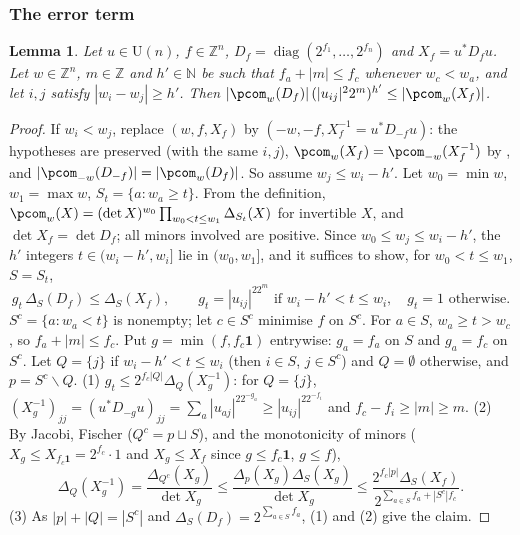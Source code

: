 \documentclass[10pt]{amsart}
\newtheorem{lemma}[theorem]{Lemma}
\theoremstyle{definition}
\theoremstyle{remark}
\newcommand{\N}{\mathbb N}
\newcommand{\Z}{\mathbb Z}
\providecommand{\auU}{\mathrm U}
\begin{document}
\subsubsection{The error term}\label{pbr:ss-error}

\begin{lemma}\label{pbr:gain}
Let $u\in\auU(n)$, $f\in\Z^n$, $D_f=\operatorname{diag}(2^{f_1},\dots,2^{f_n})$ and $X_f=u^*D_fu$. Let
$w\in\Z^n$, $m\in\Z$ and $h'\in\N$ be such that $f_a+|m|\le f_c$ whenever $w_c<w_a$, and let $i,j$ satisfy
$|w_i-w_j|\ge h'$. Then $|\pcom_w(D_f)|\,(|u_{ij}|^22^m)^{h'}\le|\pcom_w(X_f)|$.
\end{lemma}
\begin{proof}
If $w_i<w_j$, replace $(w,f,X_f)$ by $(-w,-f,X_f^{-1}=u^*D_{-f}u)$: the hypotheses are preserved (with
the same $i,j$), $\pcom_w(X_f)=\pcom_{-w}(X_f^{-1})$ by {\cite[Lemma~3.18(a)]{P49}}, and $|\pcom_{-w}
(D_{-f})|=|\pcom_w(D_f)|$. So assume $w_j\le w_i-h'$. Let $w_0=\min w$, $w_1=\max w$, $S_t=\{a:w_a\ge
t\}$. From the definition, $\pcom_w(X)=(\det X)^{w_0}\prod_{w_0<t\le w_1}\Delta_{S_t}(X)$ for invertible
$X$, and $\det X_f=\det D_f$; all minors involved are positive. Since $w_0\le w_j\le w_i-h'$, the $h'$
integers $t\in(w_i-h',w_i]$ lie in $(w_0,w_1]$, and it suffices to show, for $w_0<t\le w_1$, $S=S_t$,
\[
g_t\,\Delta_S(D_f)\le\Delta_S(X_f),\qquad g_t=|u_{ij}|^22^m\text{ if }w_i-h'<t\le w_i,\quad g_t=1
\text{ otherwise}.
\]
$S^c=\{a:w_a<t\}$ is nonempty; let $c\in S^c$ minimise $f$ on $S^c$. For $a\in S$, $w_a\ge t>w_c$, so
$f_a+|m|\le f_c$. Put $g=\min(f,f_c\mathbf 1)$ entrywise: $g_a=f_a$ on $S$ and $g_a=f_c$ on $S^c$. Let
$Q=\{j\}$ if $w_i-h'<t\le w_i$ (then $i\in S$, $j\in S^c$) and $Q=\emptyset$ otherwise, and $p=S^c
\smallsetminus Q$. (1) $g_t\le2^{f_c|Q|}\Delta_Q(X_g^{-1})$: for $Q=\{j\}$, $(X_g^{-1})_{jj}=(u^*D_{-g}
u)_{jj}=\sum_a|u_{aj}|^22^{-g_a}\ge|u_{ij}|^22^{-f_i}$ and $f_c-f_i\ge|m|\ge m$. (2) By Jacobi, Fischer
($Q^c=p\sqcup S$), and the monotonicity of minors ($X_g\le X_{f_c\mathbf 1}=2^{f_c}\cdot1$ and $X_g\le X_f$
since $g\le f_c\mathbf1$, $g\le f$),
\[
\Delta_Q(X_g^{-1})=\frac{\Delta_{Q^c}(X_g)}{\det X_g}\le\frac{\Delta_p(X_g)\Delta_S(X_g)}{\det X_g}
\le\frac{2^{f_c|p|}\Delta_S(X_f)}{2^{\sum_{a\in S}f_a+|S^c|f_c}} .
\]
(3) As $|p|+|Q|=|S^c|$ and $\Delta_S(D_f)=2^{\sum_{a\in S}f_a}$, (1) and (2) give the claim.
\end{proof}
\end{document}
